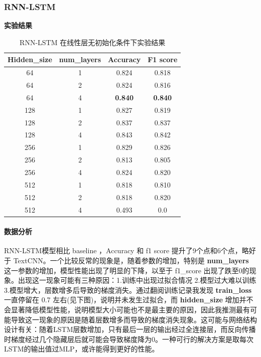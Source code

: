 \documentclass{article}
\begin{document}
\begin{spacing}{1.1}
			
		\subsubsection{RNN-LSTM}
		\textbf{实验结果}
		
		\begin{table}[h]
			\center
			\begin{tabular}{c|c|c|c}
				\textbf{Hidden\_size} & \textbf{num\_layers} & \textbf{Accuracy} & \textbf{F1 score} \\
				\hline
				64 & 1 & 0.824 & 0.818 \\
				\hline
				64 & 2 & 0.824 & 0.816\\
				\hline
				64 & 4 & \textbf{0.840} & \textbf{0.840} \\
				\hline
				128 & 1 & 0.827 & 0.819 \\
				\hline
				128 & 2 & 0.837 & 0.837\\
				\hline
				128 & 4 & 0.843 & 0.842 \\
				\hline
				256 & 1 & 0.829 & 0.826 \\
				\hline
				256 & 2 & 0.813 & 0.805\\
				\hline
				256 & 4 & 0.824 & 0.820 \\
				\hline
				512 & 1 & 0.818 & 0.810 \\
				\hline
				512 & 2 & 0.818 & 0.820 \\
				\hline
				512 & 4 & 0.493 & 0.0 \\
			\end{tabular}
			\caption{RNN-LSTM 在线性层无初始化条件下实验结果}
		\end{table}
		\paragraph*{数据分析}
			
			RNN-LSTM模型相比 baseline ，Accuracy 和 f1 score 提升了9个点和6个点，略好于 TextCNN。一个比较反常的现象是，随着参数的增加，特别是 \textbf{num\_layers} 这一参数的增加，模型性能出现了明显的下降，以至于 f1\_score 出现了跌至0的现象。出现这一现象可能有三种原因：1.训练中出现过拟合情况 2.模型过大难以训练 3.模型增大，层数增多后导致的梯度消失。通过翻阅训练记录我发现 \textbf{train\_loss} 一直停留在 0.7 左右(见下图)，说明并未发生过拟合，而 \textbf{hidden\_size} 增加并不会显著降低模型性能，说明模型大小可能也不是最主要的原因，因此我推测最有可能导致这一现象的原因是随着层数增多而导致的梯度消失现象。这可能与网络结构设计有关：随着LSTM层数增加，只有最后一层的输出经过全连接层，而反向传播时梯度经过几个隐藏层后就可能会导致梯度降为0。一种可行的解决方案是取每次LSTM的输出值过MLP，或许能得到更好的性能。
			

\end{spacing}
\end{document}

